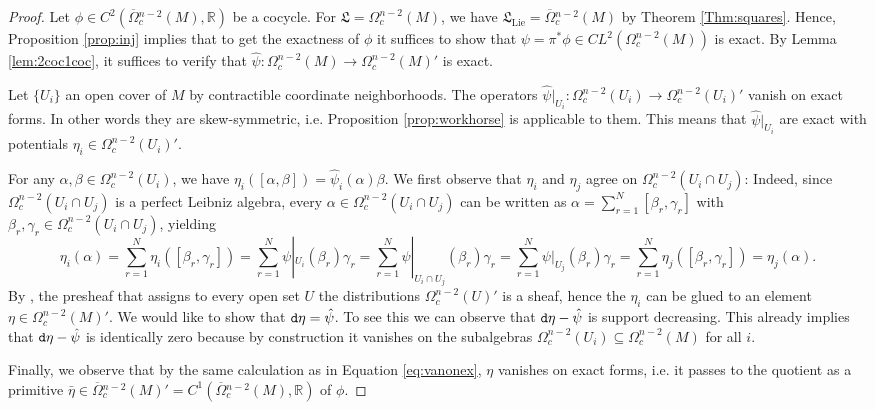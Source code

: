 \documentclass{article}
\newcommand{\R}{\mathbb{R}}
\newcommand{\Lie}{\mathrm{Lie}}
\newcommand{\oline}{\overline}
\newcommand{\dd}{{\tt d}}
\newcommand{\fL}{\mathfrak{L}}
\theoremstyle{definition}
\begin{document}
\begin{proof} Let $\phi\in C^2(\oline{\Omega}{}_c^{n-2}(M),\R)$ be a cocycle. 
For $\fL=\Omega_c^{n-2}(M)$, we have $\fL_{\Lie}=\oline{\Omega}{}_c^{n-2}(M)$
by Theorem \ref{Thm:squares}. Hence, Proposition \ref{prop:inj} implies that to get the exactness of $\phi$ it suffices to show that $\psi=\pi^*\phi\in CL^2(\Omega^{n-2}_c(M))$ is exact. By Lemma \ref{lem:2coc1coc}, it suffices to verify that $\widehat \psi\colon \Omega_c^{n-2}(M) \rightarrow \Omega^{n-2}_{c}(M)'$ is exact.
 
Let $\{U_i\}$ an open cover of $M$ by contractible coordinate neighborhoods.
The operators $\widehat \psi|_{U_i}\colon \Omega_c^{n-2}(U_i) \rightarrow \Omega^{n-2}_{c}(U_i)'$ vanish on exact forms. In other words they are skew-symmetric, i.e. Proposition \ref{prop:workhorse} is applicable to them. This means that  $\widehat\psi|_{U_i}$ are exact with potentials $\eta_i\in\Omega^{n-2}_c(U_i)'$. 


For any $\alpha,\beta\in \Omega^{n-2}_c(U_i)$, we have  $\eta_i([\alpha,\beta])=\widehat\psi_{i}(\alpha)\beta$. We first observe that 
$\eta_i$ and $\eta_j$ agree on $\Omega_{c}^{n-2}(U_i \cap U_j)$:
Indeed, since $\Omega_{c}^{n-2}(U_i \cap U_j)$ is a perfect Leibniz algebra,
every $\alpha \in \Omega^{n-2}_{c}(U_i \cap U_j)$ can be written as 
$\alpha = \sum_{r=1}^{N}[\beta_r,\gamma_r]$ with 
$\beta_r, \gamma_r \in \Omega^{n-2}_{c}(U_i \cap U_j)$, yielding
\[
\eta_i(\alpha)=\sum_{r=1}^{N}\eta_i([\beta_r,\gamma_r])=
\sum_{r=1}^{N}\psi|_{U_i}(\beta_r)\gamma_r=
\sum_{r=1}^{N}\psi|_{U_i\cap U_j}(\beta_r)\gamma_r=
\sum_{r=1}^{N}\psi|_{U_j}(\beta_r)\gamma_r=\sum_{r=1}^{N}
\eta_{j}([\beta_r,\gamma_r])=\eta_j(\alpha).
\]
By \cite[Proposition A1]{janssensNiestijl2024}, the presheaf that assigns to every open set $U$ the distributions $\Omega^{n-2}_{c}(U)'$  
is a sheaf, hence the $\eta_i$ can be glued to an element $\eta\in \Omega^{n-2}_{c}(M)'$. We would like to show that $\dd\eta=\hat\psi$. To see this we can observe that $\dd\eta-\hat\psi$ is support decreasing. This already implies that $\dd\eta-\hat\psi$ is identically zero because by construction it vanishes on the subalgebras $\Omega^{n-2}_{c}(U_i) \subseteq \Omega^{n-2}_{c}(M)$ for all $i$. 

Finally, we observe that by the same calculation as in Equation \eqref{eq:vanonex}, $\eta$ vanishes on exact forms, i.e. it passes to the quotient as a primitive 
$\bar\eta\in \oline{\Omega}{}^{n-2}_c(M)'=C^1(\oline{\Omega}{}^{n-2}_c(M),\R)$ of $\phi$.
\end{proof}
\end{document}

